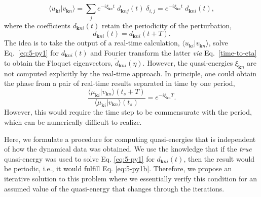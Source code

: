 \documentclass[aps,physrev,preprint,groupedaddress]{revtex4-2}
\newcommand{\kpt}{\mathbf{k}}
\newcommand{\tdKS}{|v_{\mathbf{k}n}\rangle}
\newcommand{\dFKS}{\widetilde{d}_{\kpt ni}(\eta) }
\renewcommand{\[}{\left[}
\renewcommand{\]}{\right]}
\renewcommand{\(}{\left(}
\renewcommand{\)}{\right)}
\begin{document}
\begin{equation}
     \label{eq:5-py1}
     \langle u_{\mathbf{k}i} \tdKS  = \sum_{j}{e^{-i\xi_{\kpt n} t} \; d_{\kpt nj}(t)\;\delta_{i,j}} = e^{-i\xi_{\kpt n} t} \; d_{\kpt ni}(t) ,
\end{equation}
where the coefficients $d_{\kpt ni}(t)$ retain the periodicity of the perturbation,
\begin{equation}\label{eq:5-py1b}
    d_{\kpt ni}(t)=d_{\kpt ni}(t+T).
\end{equation}
The idea is to take the output of a real-time calculation, $\langle u_{\mathbf{k}i} \tdKS$, solve Eq.~\ref{eq:5-py1} for $d_{\kpt ni}(t)$ and Fourier transform the latter \textit{via} Eq.~\ref{time-to-eta} to obtain the Floquet eigenvectors, $\dFKS$. However, the quasi-energies $\xi_{\kpt n}$ are not computed explicitly by the real-time approach. In principle, one could obtain the phase from a pair of real-time results separated in time by one period,
\begin{equation}
     \label{eq:5-py2}
     \frac{\langle \mu_{\mathbf{k}i} \tdKS(t_s+T)}{\langle \mu_{\mathbf{k}i} \tdKS(t_s)} = e^{-i\xi_{\kpt n} T}.
\end{equation}
However, this would require the time step to be commensurate with the period, which can be numerically difficult to realize. 

Here, we formulate a procedure for computing quasi-energies that is independent of how the dynamical data was obtained.  We use the knowledge  that if the \textit{true} quasi-energy was used to solve Eq. \ref{eq:5-py1} for $d_{\kpt ni}(t)$, then the result would be periodic, i.e., it would fulfill Eq. \ref{eq:5-py1b}. Therefore, we propose an iterative solution to this problem where we essentially verify this condition for an assumed value of the quasi-energy that changes through the iterations. 
\end{document}

